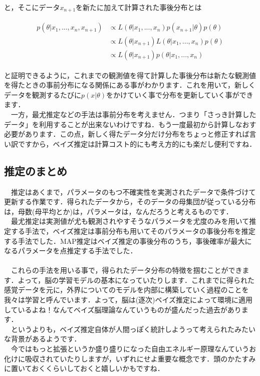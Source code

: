 \documentclass[11pt,a4paper]{jsarticle}                    %
\begin{document}
と，そこにデータ$x_{n+1}$を新たに加えて計算された事後分布とは

\begin{eqnarray}
\begin{split}
p(\theta|x_1, ..., x_{n}, x_{n+1}) &\propto L(\theta|x_1, ..., x_{n})p(x_{n+1}|\theta)p(\theta)\\ 
& \propto L(\theta|x_{n+1})L(\theta|x_1,...,x_{n}) p(\theta)\\
& \propto L(\theta|x_{n+1})p(\theta|x_1,...,x_{n})
\end{split}
\end{eqnarray}

と証明できるように，これまでの観測値を得て計算した事後分布は新たな観測値を得たときの事前分布になる関係にある事がわかります．これを用いて，新しくデータを観測するたびに$p(x|\theta)$をかけていく事で分布を更新していく事ができます．\\
　一方，最尤推定などの手法は事前分布を考えません．つまり「さっき計算したデータ」を利用することが出来ないわけですね．もう一度最初から計算しなおす必要があります．この点，新しく得たデータ分だけ分布をちょっと修正すれば言い訳ですから，ベイズ推定は計算コスト的にも考え方的にも楽だし便利ですね．




\subsection{推定のまとめ}
　推定はあくまで，パラメータのもつ不確実性を実測されたデータで条件づけて更新する作業です．得られたデータから，そのデータの母集団が従っている分布は，母数(母平均とか)は，パラメータは，なんだろうと考えるものです．\\
　最尤推定は実測値が尤も観測されやすそうなパラメータを尤度のみを用いて推定する手法で，ベイズ推定は事前分布も用いてそのパラメータの事後分布を推定する手法でした．MAP推定はベイズ推定の事後分布のうち，事後確率が最大になるパラメータを点推定する手法でした．\\
\\
　これらの手法を用いる事で，得られたデータ分布の特徴を掴むことができます．よって，脳の学習モデルの基本になっていたりします．これまでに得られた感覚データを元に，外界についてのモデルを内部に構築していく過程のことを我々は学習と呼んでいます．よって，脳は(逐次)ベイズ推定によって環境に適用しているよね！なんてベイズ脳理論なんていうものが盛んだった過去があります．\\
　というよりも，ベイズ推定自体が人間っぽく統計しようって考えられたみたいな背景があるようです．\\
　今ではもっと拡張というか盛り盛りになった自由エネルギー原理なんていうお化けに吸収されていたりしますが，いずれにせよ重要な概念です．頭のかたすみに置いておくくらいしておくと嬉しいかもですね．\\
\end{document}
